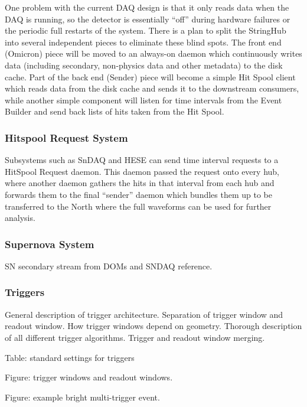One problem with the current DAQ design is that it only reads data when the
DAQ is running, so the detector is essentially ``off'' during hardware failures
or the periodic full restarts of the system.  There is a plan to split the
StringHub into several independent pieces to eliminate these blind spots.
The front end (Omicron) piece will be moved to an always-on daemon which
continuously writes data (including secondary, non-physics data and other
metadata) to the disk cache.  Part of the back end (Sender) piece will become a
simple Hit Spool client which reads data from the disk cache and sends it to
the downstream consumers, while another simple component will listen for time
intervals from the Event Builder and send back lists of hits taken from the
Hit Spool.

\subsubsection{Hitspool Request System}

Subsystems such as SnDAQ and HESE can send time interval requests to a HitSpool
Request daemon. This daemon passed the request onto every hub, where another
daemon gathers the hits in that interval from each hub and forwards them to the
final ``sender'' daemon which bundles them up to be transferred to the
North where the full waveforms can be used for further analysis.

\subsubsection{Supernova System}

SN secondary stream from DOMs and SNDAQ reference.

\subsubsection{Triggers}

General description of trigger architecture.  Separation of trigger window
and readout window.  How trigger windows depend on geometry.  Thorough
description of all different trigger algorithms. Trigger and readout window
merging.


Table: standard settings for triggers

Figure: trigger windows and readout windows.

Figure: example bright multi-trigger event.

